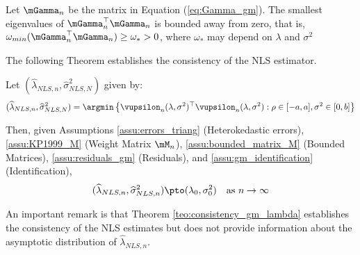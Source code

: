 \begin{assumption}\label{assu:gm_identification} Let $\mGamma_n$ be the matrix in Equation (\ref{eq:Gamma_gm}). The smallest eigenvalues of $\mGamma^\top_n\mGamma_n$ is bounded away from zero, that is, $\omega_{min} (\mGamma^\top_n\mGamma_n) \geq \omega_* > 0$, where $\omega_*$ may depend on $\lambda$ and $\sigma^2$
\end{assumption}

The following Theorem establishes the consistency of the NLS estimator. 

\begin{theorem}[Consistency]\label{teo:consistency_gm_lambda}
Let $(\widehat{\lambda}_{NLS, n}, \widehat{\sigma}^2_{NLS, N})$ given by:
\begin{equation*}
  (\widehat{\lambda}_{NLS, n}, \widehat{\sigma}^2_{NLS, N}) = \argmin \left\lbrace \vupsilon_n(\lambda, \sigma^2)^\top\vupsilon_n(\lambda, \sigma^2): \rho \in [-a, a], \sigma^2\in [0, b]\right\rbrace 
\end{equation*}

Then, given Assumptions \ref{assu:errors_triang} (Heterokedastic errors), \ref{assu:KP1999_M} (Weight Matrix $\mM_n$), \ref{assu:bounded_matrix_M} (Bounded Matrices), \ref{assu:residuals_gm} (Residuals), and \ref{assu:gm_identification} (Identification),
\begin{equation*}
(\widehat{\lambda}_{NLS, n}, \widehat{\sigma}^2_{NLS, n})  \pto (\lambda_0, \sigma^2_0)\quad \mbox{as $n\to \infty$}
\end{equation*}
\end{theorem}

An important remark is that Theorem \ref{teo:consistency_gm_lambda} establishes the consistency of the NLS estimates but does not provide information about the asymptotic distribution of  $\widehat{\lambda}_{NLS, n}$.

